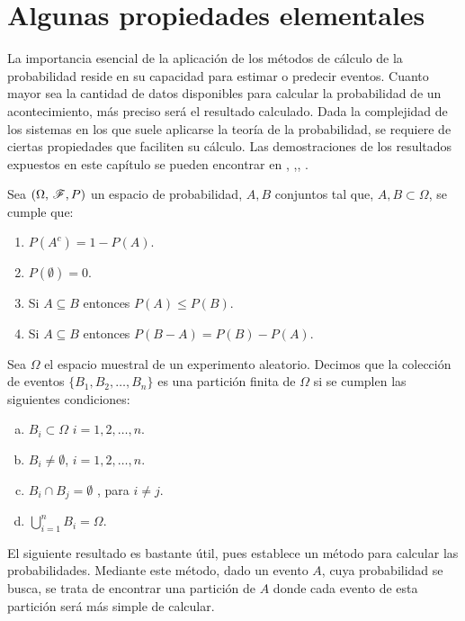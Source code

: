 \section{Algunas propiedades elementales}

La importancia esencial de la aplicación de los métodos de cálculo de la probabilidad reside en su capacidad para estimar o predecir eventos. Cuanto mayor sea la cantidad de datos disponibles para calcular la probabilidad de un acontecimiento, más preciso será el resultado calculado. Dada la complejidad de los sistemas en los que suele aplicarse la teoría de la probabilidad, se requiere de ciertas propiedades que faciliten su cálculo.
Las demostraciones de los resultados expuestos en este capítulo se pueden encontrar en \cite{intro-probabilidad}, \cite{Feller},\cite{Rincon1}, \cite{Rincon2}.
\begin{Prop}
    Sea $(\Omega,\thinspace\mathscr{F},P)$ un espacio de probabilidad, $A,B$ conjuntos tal que, $A,B\subset\Omega$, se cumple que:
    \begin{enumerate}
        \item $P(A^c)=1-P(A)$.
        \item $P(\emptyset)=0$.
        \item Si $A\subseteq B$ entonces $P(A)\leq P(B)$.
        \item Si $A\subseteq B$ entonces $P(B-A)=P(B)-P(A)$.
    \end{enumerate}
\end{Prop}
\begin{Def}
    Sea $\Omega$ el espacio muestral de un experimento aleatorio. Decimos que la colección de eventos $\{B_1,B_2,\ldots,B_n\}$ es una partición finita de $\Omega$ si se cumplen las siguientes condiciones:
    \begin{enumerate}[a)]
        \item $B_i\subset\Omega$ $i=1,2,\ldots,n$.
        \item $B_i\not=\emptyset$, $i=1,2,\ldots,n$.
        \item $B_i\cap B_j=\emptyset$ , para $i\not= j$.
        \item $\bigcup_{i=1}^n B_i=\Omega$.
    \end{enumerate}
\end{Def}
El siguiente resultado es bastante útil, pues establece un método para calcular las probabilidades. Mediante este método, dado un evento $A$, cuya probabilidad se busca, se trata de encontrar una partición de $A$ donde cada evento de esta partición será más simple de calcular.

